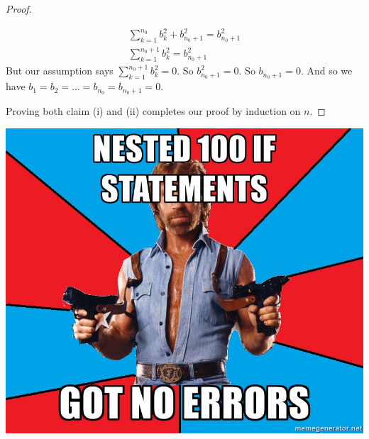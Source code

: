 \documentclass{article}
\theoremstyle{claim}
\theoremstyle{definition}
\begin{document}
\begin{enumerate}
\begin{proof}
\begin{enumerate}
                        \begin{align*}
                            \sum\limits_{k=1}^{n_0} b_k^2 + b_{n_0 + 1}^2 = b_{n_0 + 1}^2\\
                            \sum\limits_{k=1}^{n_0 + 1} b_k^2 = b_{n_0 + 1}^2
                        \end{align*}
                But our assumption says $\sum\limits_{k=1}^{n_0 + 1} b_k^2 = 0$. So $b_{n_0 + 1}^2 = 0$. So $b_{n_0 + 1} = 0$.
                And so we have $b_1 = b_2 = ... = b_{n_0} = b_{n_0 + 1} = 0$.\\
                \end{enumerate}
                Proving both claim (i) and (ii) completes our proof by induction on $n$. 
            \end{proof}
\end{enumerate}
\centering
\includegraphics[scale=0.5]{34211278}
\end{document}
